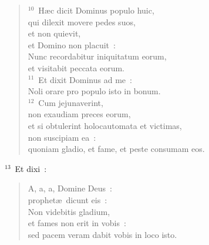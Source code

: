 \begin{flushleft}
\begin{verse}
${}^{10}$~H\ae c dicit Dominus populo huic,\\ qui dilexit movere pedes suos,\\ et non quievit,\\ et Domino non placuit~:\\ Nunc recordabitur iniquitatum eorum,\\ et visitabit peccata eorum.\\
${}^{11}$~Et dixit Dominus ad me~:\\ Noli orare pro populo isto in bonum.\\
${}^{12}$~Cum jejunaverint,\\ non exaudiam preces eorum,\\ et si obtulerint holocautomata et victimas,\\ non suscipiam ea~:\\ quoniam gladio, et fame, et peste consumam eos.\end{verse}\end{flushleft}


${}^{13}$~Et dixi~: \begin{flushleft}\begin{verse}A, a, a, Domine Deus~:\\ prophet\ae\ dicunt eis~:\\ Non videbitis gladium,\\ et fames non erit in vobis~:\\ sed pacem veram dabit vobis in loco isto.\end{verse}\end{flushleft}



